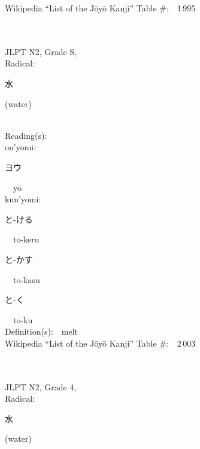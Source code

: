 \begin{multicols}{2}
Wikipedia ``List of the J\=oy\=o Kanji'' Table \#:\ \ 1\,995 \\
\ \ \\
{\fontsize{34pt}{40pt}  }\ \ \\  %
{JLPT N2, Grade S, \\Radical:\ \ {\begin{CJK}{UTF8}{min} 水 \end{CJK}} (water) } \\
Reading(s):\ \ \\
{\hspace*{1em}}on'yomi:\ \ \\
{\hspace*{2em}}{\begin{CJK}{UTF8}{min} ヨウ \end{CJK}}\ \ y\=o\ \ \\
{\hspace*{1em}}kun'yomi:\ \ \\
{\hspace*{2em}}{\begin{CJK}{UTF8}{min} と-ける \end{CJK}}\ \ to-keru\ \ \\
{\hspace*{2em}}{\begin{CJK}{UTF8}{min} と-かす \end{CJK}}\ \ to-kasu\ \ \\
{\hspace*{2em}}{\begin{CJK}{UTF8}{min} と-く \end{CJK}}\ \ to-ku\ \ \\
Definition(s):\ \ melt \\
Wikipedia ``List of the J\=oy\=o Kanji'' Table \#:\ \ 2\,003 \\
\ \ \\
{\fontsize{34pt}{40pt}  }\ \ \\  %
{JLPT N2, Grade 4, \\Radical:\ \ {\begin{CJK}{UTF8}{min} 水 \end{CJK}} (water) } \\

\end{multicols}
